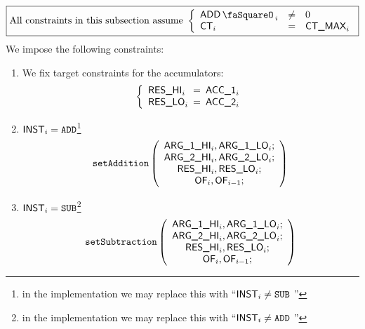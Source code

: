 \[
	\boxed{\text{All constraints in this subsection assume }
	\left\{ \begin{array}{lcl}
		\addStamp_{i} & \neq & 0          \\
		\ct_{i}       & =    & \maxCt_{i} \\
	\end{array} \right. }
\]
We impose the following constraints:
\begin{enumerate}
	\item We fix target constraints for the accumulators:
		\[
			\left\{ \begin{array}{lcl}
				\resHi_{i} & \!\!\! = \!\!\! & \acc{1}_{i} \\
				\resLo_{i} & \!\!\! = \!\!\! & \acc{2}_{i} \\
			\end{array} \right.
		\]
	\item \If $\textsf{INST}_{i} = \texttt{ADD}$\footnote{in the implementation we may replace this with ``\If $\textsf{INST}_{i} \neq \texttt{SUB}$ \Then''}
		\Then
		\[
			\texttt{setAddition}
			\left( \begin{array}{c}
				\textsf{ARG}\textsf{\_1}\textsf{\_HI}_{i}, \textsf{ARG}\textsf{\_1}\textsf{\_LO}_{i};   \\
				\textsf{ARG}\textsf{\_2}\textsf{\_HI}_{i}, \textsf{ARG}\textsf{\_2}\textsf{\_LO}_{i};   \\
				\textsf{RES}\textsf{\_HI}_{i}, \textsf{RES}\textsf{\_LO}_{i};         \\
				\textsf{OF}_{i}, \textsf{OF}_{i-1}; \\
			\end{array} \right)
		\]
	\item \If $\textsf{INST}_{i} = \texttt{SUB}$\footnote{in the implementation we may replace this with ``\If $\textsf{INST}_{i} \neq \texttt{ADD}$ \Then''}
		\Then
		\[
			\texttt{setSubtraction}
			\left( \begin{array}{c}
				\textsf{ARG}\textsf{\_1}\textsf{\_HI}_{i}, \textsf{ARG}\textsf{\_1}\textsf{\_LO}_{i};   \\
				\textsf{ARG}\textsf{\_2}\textsf{\_HI}_{i}, \textsf{ARG}\textsf{\_2}\textsf{\_LO}_{i};   \\
				\textsf{RES}\textsf{\_HI}_{i}, \textsf{RES}\textsf{\_LO}_{i};         \\
				\textsf{OF}_{i}, \textsf{OF}_{i-1}; \\
			\end{array} \right)
		\]
\end{enumerate}

